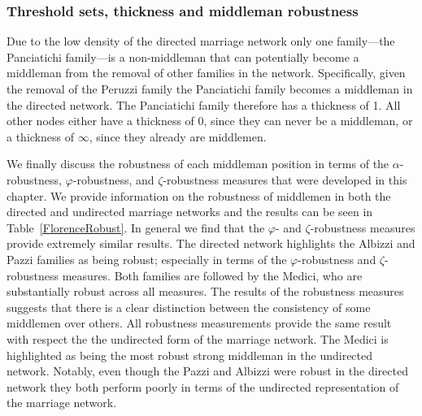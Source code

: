 \subsubsection{Threshold sets, thickness and middleman robustness}

Due to the low density of the directed marriage network only one family---the Panciatichi family---is a non-middleman that can potentially become a middleman from the removal of other families in the network. Specifically, given the removal of the Peruzzi family the Panciatichi family becomes a middleman in the directed network. The Panciatichi family therefore has a thickness of 1. All other nodes either have a thickness of 0, since they can never be a middleman, or a thickness of $\infty$, since they already are middlemen.

We finally discuss the robustness of each middleman position in terms of the $\alpha$-robustness, $\varphi$-robustness, and $\zeta$-robustness measures that were developed in this chapter. We provide information on the robustness of middlemen in both the directed and undirected marriage networks and the results can be seen in Table~\ref{FlorenceRobust}. In general we find that the $\varphi$- and $\zeta$-robustness measures provide extremely similar results. The directed network highlights the Albizzi and Pazzi families as being robust; especially in terms of the $\varphi$-robustness and $\zeta$-robustness measures. Both families are followed by the Medici, who are substantially robust across all measures. The results of the robustness measures suggests that there is a clear distinction between the consistency of some middlemen over others. All robustness measurements provide the same result with respect the the undirected form of the marriage network. The Medici is highlighted as being the most robust strong middleman in the undirected network. Notably, even though the Pazzi and Albizzi were robust in the directed network they both perform poorly in terms of the undirected representation of the marriage network.

